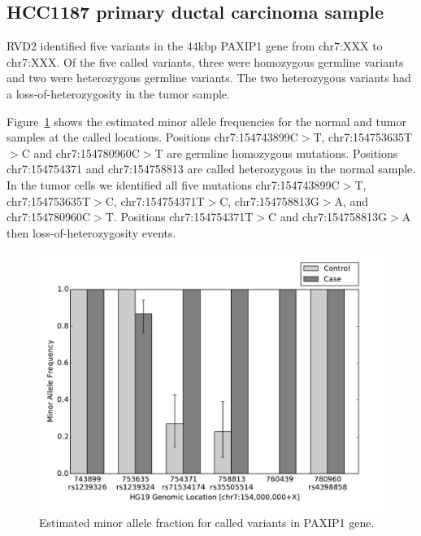 \documentclass[11pt,reqno]{amsart}
\begin{document}
\subsection{HCC1187 primary ductal carcinoma sample}\label{sec:brca}

RVD2 identified five variants in the 44kbp PAXIP1 gene from chr7:XXX to chr7:XXX. Of the five called variants, three were homozygous germline variants and two were heterozygous germline variants. The two heterozygous variants had a loss-of-heterozygosity in the tumor sample. 

Figure~\ref{fig:brca_MAF} shows the estimated minor allele frequencies for the normal and tumor samples at the called locations. Positions chr7:154743899C$>$T, chr7:154753635T$>$C and chr7:154780960C$>$T are germline homozygous mutations. Positions chr7:154754371 and chr7:154758813 are called heterozygous in the normal sample. In the tumor cells we identified all five mutations chr7:154743899C$>$T, chr7:154753635T$>$C, chr7:154754371T$>$C, chr7:154758813G$>$A, and chr7:154780960C$>$T. Positions chr7:154754371T$>$C and chr7:154758813G$>$A then loss-of-heterozygosity events.



\begin{figure}[h]
\begin{center}
\includegraphics[width=120mm]{pdf_figs/HCC1187_MuBarPlot.pdf}
\caption{Estimated minor allele fraction for called variants in PAXIP1 gene.}
\label{fig:brca_MAF}
\end{center}
\end{figure}
\end{document}
